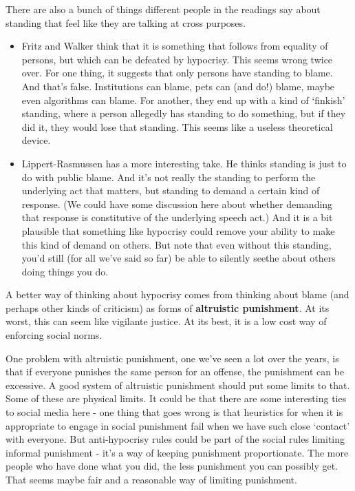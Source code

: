 \documentclass[
]{article}
\providecommand{\tightlist}{%
  \setlength{\itemsep}{0pt}\setlength{\parskip}{0pt}}
\begin{document}
There are also a bunch of things different people in the readings say
about standing that feel like they are talking at cross purposes.

\begin{itemize}
\tightlist
\item
  Fritz and Walker think that it is something that follows from equality
  of persons, but which can be defeated by hypocrisy. This seems wrong
  twice over. For one thing, it suggests that only persons have standing
  to blame. And that's false. Institutions can blame, pets can (and do!)
  blame, maybe even algorithms can blame. For another, they end up with
  a kind of `finkish' standing, where a person allegedly has standing to
  do something, but if they did it, they would lose that standing. This
  seems like a useless theoretical device.
\item
  Lippert-Rasmussen has a more interesting take. He thinks standing is
  just to do with public blame. And it's not really the standing to
  perform the underlying act that matters, but standing to demand a
  certain kind of response. (We could have some discussion here about
  whether demanding that response is constitutive of the underlying
  speech act.) And it is a bit plausible that something like hypocrisy
  could remove your ability to make this kind of demand on others. But
  note that even without this standing, you'd still (for all we've said
  so far) be able to silently seethe about others doing things you do.
\end{itemize}

A better way of thinking about hypocrisy comes from thinking about blame
(and perhaps other kinds of criticism) as forms of \textbf{altruistic
punishment}. At its worst, this can seem like vigilante justice. At its
best, it is a low cost way of enforcing social norms.

One problem with altruistic punishment, one we've seen a lot over the
years, is that if everyone punishes the same person for an offense, the
punishment can be excessive. A good system of altruistic punishment
should put some limits to that. Some of these are physical limits. It
could be that there are some interesting ties to social media here - one
thing that goes wrong is that heuristics for when it is appropriate to
engage in social punishment fail when we have such close `contact' with
everyone. But anti-hypocrisy rules could be part of the social rules
limiting informal punishment - it's a way of keeping punishment
proportionate. The more people who have done what you did, the less
punishment you can possibly get. That seems maybe fair and a reasonable
way of limiting punishment.
\end{document}

